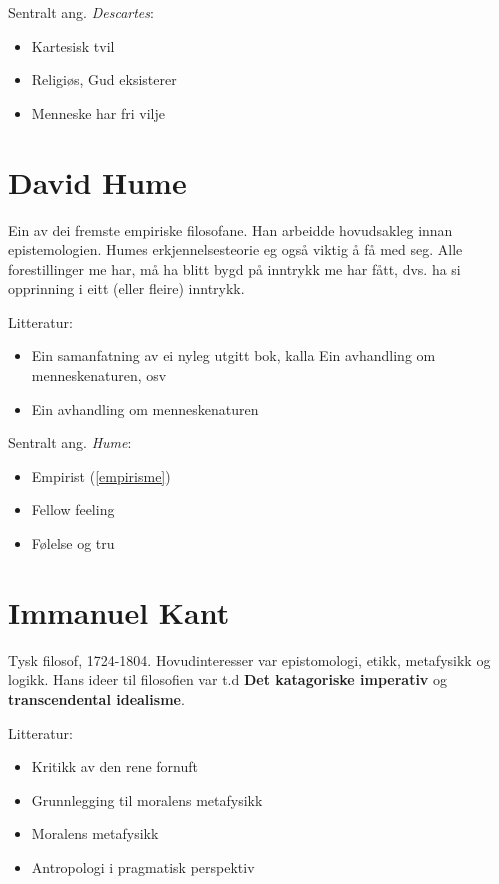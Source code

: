 \documentclass[a4paper]{IEEEtran}
\begin{document}
Sentralt ang. \textit{Descartes}:
\begin{itemize}\bigskip
    \item Kartesisk tvil
    \item Religiøs, Gud eksisterer
    \item Menneske har fri vilje
\end{itemize}\bigskip

\section{David Hume}
\label{hume}\bigskip

Ein av dei fremste empiriske filosofane. Han arbeidde hovudsakleg innan epistemologien. Humes erkjennelsesteorie eg også viktig å få med seg. Alle forestillinger me har, må ha blitt bygd på inntrykk me har fått, dvs. ha si opprinning i eitt (eller fleire) inntrykk.
\bigskip

Litteratur:
\begin{itemize}\bigskip
    \item Ein samanfatning av ei nyleg utgitt bok, kalla Ein avhandling om menneskenaturen, osv
    \item Ein avhandling om menneskenaturen
\end{itemize}\bigskip 

Sentralt ang. \textit{Hume}:
\begin{itemize}\bigskip
    \item Empirist (\ref{empirisme})
    \item Fellow feeling
    \item Følelse og tru
\end{itemize}\bigskip


\section{Immanuel Kant}
\label{kant}\bigskip

Tysk filosof, 1724-1804. Hovudinteresser var epistomologi, etikk, metafysikk og logikk. Hans ideer til filosofien var t.d \textbf{Det katagoriske imperativ} og \textbf{transcendental idealisme}.\bigskip

Litteratur:
\begin{itemize}
    \item Kritikk av den rene fornuft
    \item Grunnlegging til moralens metafysikk
    \item Moralens metafysikk
    \item Antropologi i pragmatisk perspektiv
\end{itemize}\bigskip 
\end{document}
